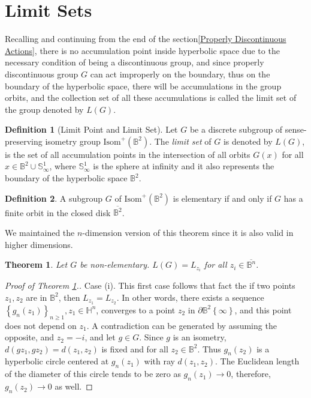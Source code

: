 \documentclass[12pt,oneside]{sfsuthesis}
\theoremstyle{plain} %
\newtheorem{theorem}{Theorem}[chapter]
\theoremstyle{definition}  %
\newtheorem{definition}{Definition}[chapter]
\theoremstyle{remark}  %
\theoremstyle{plain}
\begin{document}
{\section{Limit Sets}

Recalling and continuing from the end of the section\ref{Properly Discontinuous Actions}, there is no accumulation point inside hyperbolic space due to the necessary condition of being a discontinuous group, and since properly discontinuous group $G$ can act improperly on the boundary, thus on the boundary of the hyperbolic space, there will be accumulations in the group orbits, and the collection set of all these accumulations is called the limit set of the group denoted by $L(G)$.

\begin{definition}[Limit Point and Limit Set]\cite{ahlfors1981mobius}
Let $G$ be a discrete subgroup of sense-preserving isometry group $\text{Isom}^+(\mathbb{B}^{2})$. The \textit{limit set} of $G$ is denoted by $L(G)$, is the set of all accumulation points in the intersection of all orbits $G(x)$ for all $x\in \mathbb{B}^2\cup \mathbb{S}^{1}_\infty$, where $\mathbb{S}^{1}_\infty$ is the sphere at infinity and it also represents the boundary of the hyperbolic space $\mathbb{B}^{2}$.

\end{definition}

\begin{definition}\label{elementary}
A subgroup $G$ of $\text{Isom}^+(\mathbb{B}^{2})$ is elementary if and only if $G$ has a finite orbit in the closed disk $\overline{\mathbb{B}^{2}}$.
\end{definition}


We maintained the $n$-dimension version of this theorem since it is also valid in higher dimensions.

\begin{theorem}\cite[P.80]{ahlfors1981mobius}\label{ahlfors thm}
Let $G$ be non-elementary. $L(G)=L_{z_i}$ for all $z_i\in \overline{\mathbb{B}^n}$.
\end{theorem}

\begin{proof}[Proof of Theorem \ref{ahlfors thm}.\cite{ahlfors1981mobius, ratcliffe1994foundations, dal2010geodesic}]
Case (i). This first case follows that fact the if two points $z_1,z_2$ are in $\mathbb{B}^2$, then $L_{z_1}=L_{z_2}$. In other words, there exists a sequence $\left\lbrace g_n(z_1)\right\rbrace_{n\geq 1}, z_1\in\mathbb{H}^n$, converges to a point $z_2$ in $\partial \mathbb{B}^2 \left\lbrace \infty\right\rbrace$, and this point does not depend on $z_1$. A contradiction can be generated by assuming the opposite, and $z_2=-i$, and let $g\in G$. Since $g$ is an isometry, $d(gz_1,gz_2)=d(z_1,z_2)$ is fixed and for all $z_2\in \mathbb{B}^2$. Thus $g_n(z_2)$ is a hyperbolic circle centered at $g_n(z_1)$ with ray $d(z_1,z_2)$. The Euclidean length of the diameter of this circle tends to be zero as $g_n(z_1)\to 0$, therefore, $g_n(z_2)\to 0$ as well.



\end{proof}}
\end{document}
